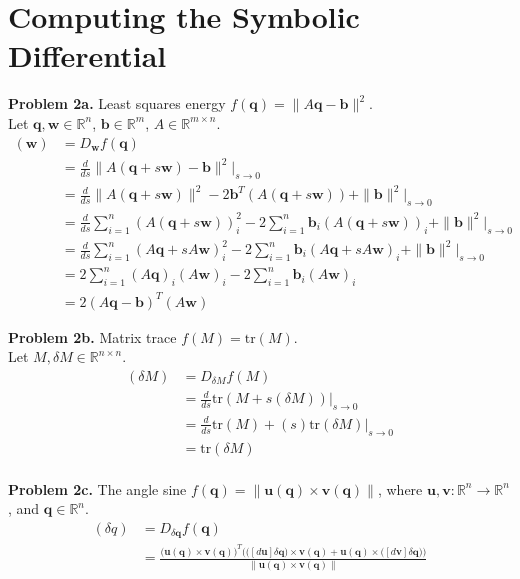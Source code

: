 \documentclass[11pt]{article}
\newcommand{\bq}{\mathbf{q}}
\newcommand{\bb}{\mathbf{b}}
\newcommand{\bu}{\mathbf{u}}
\newcommand{\bv}{\mathbf{v}}
\newcommand{\bw}{\mathbf{w}}
\begin{document}
\pagebreak

\section{Computing the Symbolic Differential}

\noindent \textbf{Problem 2a.}
Least squares energy $f(\bq) = \|A\bq -\bb\|^2$. \\

\noindent Let $\bq, \bw \in \mathbb{R}^n$, $\bb \in \mathbb{R}^m$, $A \in \mathbb{R}^{m \times n}$.
\begin{align*}
[df(\bq)](\bw) 
    &= D_\bw f(\bq) \\
    &= \frac{d}{ds} \|A (\bq + s \bw) - \bb\|^2 \Big|_{s \to 0} \\
    &= \frac{d}{ds} \|A (\bq + s \bw)\|^2 - 2 \bb^T (A (\bq + s \bw)) + \|\bb\|^2 \Big|_{s \to 0} \\
    &= \frac{d}{ds} \sum_{i=1}^n (A (\bq + s \bw))_i^2 - 2 \sum_{i=1}^n \bb_i (A (\bq + s \bw))_i + \|\bb\|^2 \Big|_{s \to 0} \\
    &= \frac{d}{ds} \sum_{i=1}^n (A \bq + s A \bw)_i^2 - 2 \sum_{i=1}^n \bb_i (A \bq + s A \bw)_i + \|\bb\|^2 \Big|_{s \to 0} \\
    &= 2 \sum_{i=1}^n (A \bq)_i (A \bw)_i - 2 \sum_{i=1}^n \bb_i (A \bw)_i \\
    &= 2 (A \bq - \bb)^T (A \bw)
\end{align*}

\noindent \textbf{Problem 2b.}
Matrix trace $f(M) = \mathrm{tr}(M)$. \\

\noindent Let $M, \delta M \in \mathbb{R}^{n \times n}$.
\begin{align*}
[df(M)](\delta M) 
    &= D_{\delta M} f(M) \\
    &= \frac{d}{ds} \mathrm{tr}(M + s(\delta M)) \Big|_{s \to 0} \\
    &= \frac{d}{ds} \mathrm{tr}(M) + (s) \mathrm{tr}(\delta M) \Big|_{s \to 0} \\
    &= \mathrm{tr}(\delta M) \\
\end{align*}

\noindent \textbf{Problem 2c.}
The angle sine $f(\bq) = \|\bu(\bq) \times \bv(\bq)\|$, where $\bu, \bv : \mathbb{R}^n \to \mathbb{R}^n$, and $\bq \in \mathbb{R}^n$. 
\begin{align*}
[df(q)](\delta q) 
    &= D_{\delta \bq} f(\bq) \\
    &= \frac{\Big(\bu(\bq) \times \bv(\bq)\Big)^T \Big(\big([d\bu] \delta \bq \big) \times \bv(\bq) + \bu(\bq) \times \big([d\bv] \delta \bq\big) \Big)}{\|\bu(\bq) \times \bv(\bq)\|} 
\end{align*}
\end{document}
